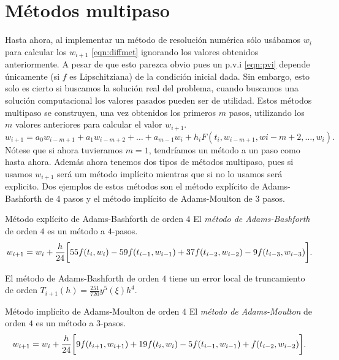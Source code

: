 \section{Métodos multipaso}

Hasta ahora, al implementar un método de resolución numérica sólo usábamos
$w_i$ para calcular los $w_{i+1}$ \eqref{eqn:diffmet}
ignorando los valores obtenidos anteriormente.
A pesar de que esto parezca obvio pues un p.v.i \eqref{eqn:pvi}
depende únicamente (si $f$ es Lipschitziana) de la condición inicial dada.
Sin embargo, esto solo es cierto si buscamos la solución real del problema,
cuando buscamos una solución computacional
los valores pasados pueden ser de utilidad.
Estos métodos multipaso se construyen, una vez obtenidos los primeros $m$ pasos,
utilizando los $m$ valores anteriores para calcular el valor $w_{i+1}$.
\begin{equation*}
    w_{i+1} = a_0w_{i-m+1} + a_1w_{i-m+2} + \dots + a_{m-1}w_i
        + h_iF(t_i,w_{i-m+1},w{i-m+2},\dots,w_i).
\end{equation*}
Nótese que si ahora tuvieramos $m = 1$,
tendríamos un método a un paso como hasta ahora.
Además ahora tenemos dos tipos de métodos multipaso, pues si usamos $w_{i+1}$
será um método implícito mientras que si no lo usamos será explicito.
Dos ejemplos de estos métodos son
el método explícito de Adams-Bashforth de $4$ pasos
y el método implícito de Adams-Moulton de $3$ pasos.

\begin{method}{Método explícito de Adams-Bashforth de orden $4$}
    El \emph{método de Adams-Bashforth} de orden $4$
    es un método a $4$-pasos.
    \begin{equation}\label{eqn:AB4steps}
        w_{i+1} = w_i + \frac{h}{24}\qty\bigg[
            55f(t_i, w_i) - 59f(t_{i-1}, w_{i-1})
            + 37f(t_{i-2}, w_{i-2}) - 9f(t_{i-3}, w_{i-3})
        ].
    \end{equation}
\end{method}

\begin{proposition}
    El método de Adams-Bashforth de orden $4$
    tiene un error local de truncamiento
    de orden $T_{i+1}(h) = \frac{251}{720}y^5(\xi)h^4$.
\end{proposition}

\begin{method}{Método implícito de Adams-Moulton de orden $4$}
    El \emph{método de Adams-Moulton} de orden $4$
    es un método a $3$-pasos.
    \begin{equation}\label{eqn:AM3steps}
        w_{i+1} = w_i + \frac{h}{24}\qty\bigg[
            9f(t_{i+1}, w_{i+1}) + 19f(t_i, w_i)
            - 5f(t_{i-1}, w_{i-1}) + f(t_{i-2}, w_{i-2})
        ].
    \end{equation}
\end{method}


